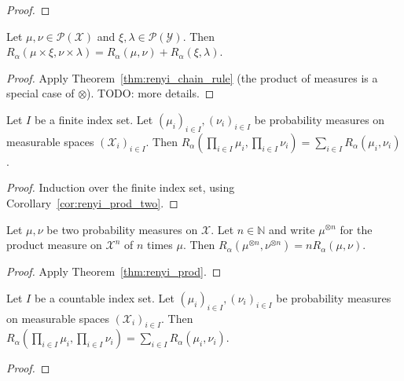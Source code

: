 \begin{proof}%
{}

\end{proof}


\begin{corollary}
  \label{cor:renyi_prod_two}
  Let $\mu, \nu \in \mathcal P(\mathcal X)$ and $\xi, \lambda \in \mathcal P(\mathcal Y)$.
  Then $R_\alpha(\mu \times \xi, \nu \times \lambda) = R_\alpha(\mu, \nu) + R_\alpha(\xi, \lambda)$.
\end{corollary}

\begin{proof}%
{}
Apply Theorem~\ref{thm:renyi_chain_rule} (the product of measures is a special case of $\otimes$). TODO: more details.
\end{proof}

\begin{theorem}
  \label{thm:renyi_prod}
  Let $I$ be a finite index set. Let $(\mu_i)_{i \in I}, (\nu_i)_{i \in I}$ be probability measures on measurable spaces $(\mathcal X_i)_{i \in I}$.
  Then $R_\alpha (\prod_{i \in I} \mu_i, \prod_{i \in I} \nu_i) = \sum_{i \in I} R_\alpha(\mu_i, \nu_i)$.
\end{theorem}

\begin{proof}%
{}
Induction over the finite index set, using Corollary~\ref{cor:renyi_prod_two}.
\end{proof}

\begin{corollary}
  \label{lem:renyi_prod_n}
  Let $\mu, \nu$ be two probability measures on $\mathcal X$. Let $n \in \mathbb{N}$ and write $\mu^{\otimes n}$ for the product measure on $\mathcal X^n$ of $n$ times $\mu$.
  Then $R_\alpha(\mu^{\otimes n}, \nu^{\otimes n}) = n R_\alpha(\mu, \nu)$.
\end{corollary}

\begin{proof}%
{}
Apply Theorem~\ref{thm:renyi_prod}.
\end{proof}

\begin{theorem}
  \label{thm:renyi_prod_countable}
  Let $I$ be a countable index set. Let $(\mu_i)_{i \in I}, (\nu_i)_{i \in I}$ be probability measures on measurable spaces $(\mathcal X_i)_{i \in I}$.
  Then $R_\alpha (\prod_{i \in I} \mu_i, \prod_{i \in I} \nu_i) = \sum_{i \in I} R_\alpha(\mu_i, \nu_i)$.
\end{theorem}

\begin{proof}%
{}
\end{proof}
